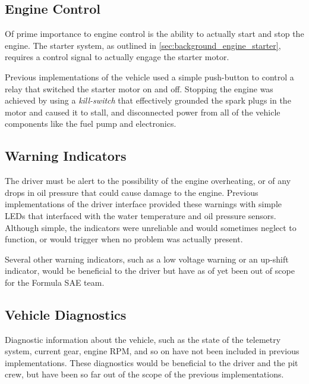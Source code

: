 \subsection{Engine Control}

Of prime importance to engine control is the ability to actually start and stop the engine. The starter system, as outlined in \ref{sec:background_engine_starter}, requires a control signal to actually engage the starter motor. 

Previous implementations of the vehicle used a simple push-button to control a relay that switched the starter motor on and off. Stopping the engine was achieved by using a \emph{kill-switch} that effectively grounded the spark plugs in the motor and caused it to stall, and disconnected power from all of the vehicle components like the fuel pump and electronics.
 
\subsection{Warning Indicators}

The driver must be alert to the possibility of the engine overheating, or of any drops in oil pressure that could cause damage to the engine. Previous implementations of the driver interface provided these warnings with simple LEDs that interfaced with the water temperature and oil pressure sensors. Although simple, the indicators were unreliable and would sometimes neglect to function, or would trigger when no problem was actually present. 

Several other warning indicators, such as a low voltage warning or an up-shift indicator, would be beneficial to the driver but have as of yet been out of scope for the Formula SAE team.

\subsection{Vehicle Diagnostics}

Diagnostic information about the vehicle, such as the state of the telemetry system, current gear, engine RPM, and so on have not been included in previous implementations. These diagnostics would be beneficial to the driver and the pit crew, but have been so far out of the scope of the previous implementations.

